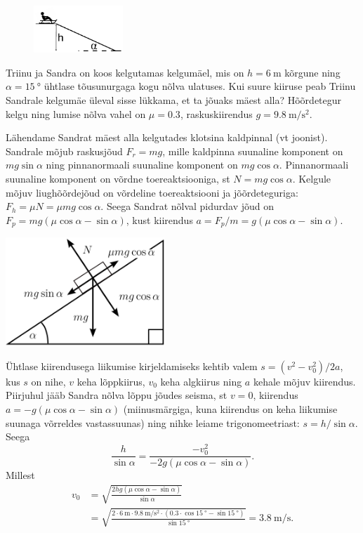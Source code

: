 
\begin{figure}
  \vspace*{-5mm}
    \includegraphics[width=0.3\textwidth]{2024-v3g-01-yl.pdf}
\end{figure}
Triinu ja Sandra on koos kelgutamas kelgumäel, mis on $h=\SI{6}{\m}$ kõrgune ning $\alpha=\SI{15}{\degree}$ ühtlase tõusunurgaga kogu nõlva ulatuses. Kui suure kiiruse peab Triinu Sandrale kelgumäe üleval sisse lükkama, et ta jõuaks mäest alla? Hõõrdetegur kelgu ning lumise nõlva vahel on $\mu=\num{0.3}$, raskuskiirendus $g=\SI{9.8}{\m\per\s\squared}$.


\hint

\solu
Lähendame Sandrat mäest alla kelgutades klotsina kaldpinnal (vt joonist). Sandrale mõjub raskusjõud $F_r=mg$, mille kaldpinna suunaline komponent on $mg\sin\alpha$ ning pinnanormaali suunaline komponent on $mg\cos\alpha$. Pinnanormaali suunaline komponent on võrdne toereaktsiooniga, st $N=mg\cos\alpha$. Kelgule mõjuv liughõõrdejõud on võrdeline toereaktsiooni ja jõõrdeteguriga: $F_h=\mu N=\mu mg\cos\alpha$. Seega Sandrat nõlval pidurdav jõud on $F_p = mg(\mu \cos\alpha - \sin\alpha)$, kust kiirendus $a=F_p/m=g(\mu \cos\alpha - \sin\alpha)$.
\begin{center}
\includegraphics[width=0.45\textwidth]{2024-v3g-01-sol.png}
\end{center}
Ühtlase kiirendusega liikumise kirjeldamiseks kehtib valem $s=(v^2-v_0^2)/2a$, kus $s$ on nihe, $v$ keha lõppkiirus, $v_0$ keha algkiirus ning $a$ kehale mõjuv kiirendus. Piirjuhul jääb Sandra nõlva lõppu jõudes seisma, st $v=0$, kiirendus $a=-g(\mu \cos\alpha - \sin\alpha)$ (miinusmärgiga, kuna kiirendus on keha liikumise suunaga võrreldes vastassuunas) ning nihke leiame trigonomeetriast: $s=h/\sin\alpha$. Seega
\[
  \frac{h}{\sin\alpha} = \frac{-v_0^2}{-2g(\mu \cos\alpha - \sin\alpha)}.
\]
Millest
\begin{align*}
  v_0 &= \sqrt{\frac{2hg(\mu \cos\alpha - \sin\alpha)}{\sin\alpha}}\\
  &= \sqrt{\frac{2\cdot\SI{6}{\m}\cdot \SI{9.8}{\m\per\s\squared}  \cdot (0.3\cdot \cos \SI{15}{\degree}  - \sin\SI{15}{\degree})}{\sin\SI{15}{\degree}}} = \SI{3.8}{\m\per\s}.
\end{align*}
\probend